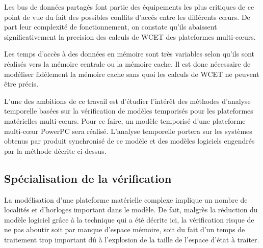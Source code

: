     Les bus de données partagés font partie des équipements les plus critiques
    de ce point de vue du fait des possibles conflits d'accés entre les
    différents c{\oe}urs. De part leur complexité de fonctionnement, on constate
    qu'ils abaissent significativement la precision des calculs de WCET des
    plateformes multi-c{\oe}urs.

    Les temps d'accès à des données en mémoire sont très variables selon qu'ils
    sont réalisés vers la mémoire centrale ou la mémoire cache. Il est donc
    nécessaire de modéliser fidélement la mémoire cache sans quoi les calculs de
    WCET ne peuvent être précis.


    \vspace{1em}


    L'une des ambitions de ce travail est d'étudier l'intérêt des méthodes
    d'analyse temporelle basées sur la vérification de modèles temporisés pour
    les plateformes matérielles multi-c{\oe}urs. Pour ce faire, un modèle
    temporisé d'une plateforme multi-c{\oe}ur PowerPC sera réalisé.  L'analyse
    temporelle portera sur les systèmes obtenus par produit synchronisé de ce
    modèle et des modèles logiciels engendrés par la méthode décrite ci-dessus.

  \subsection{Spécialisation de la vérification}


    La modélisation d'une plateforme matérielle complexe implique un nombre de
    localités et d'horloges important dans le modèle. De fait, malgrès la
    réduction du modèle logiciel grâce à la technique qui a été décrite ici, la
    vérification risque de ne pas aboutir
    soit par manque d'espace mémoire, soit du fait d'un temps de traitement trop
    important dû à l'explosion de la taille de l'espace d'état à traiter.

